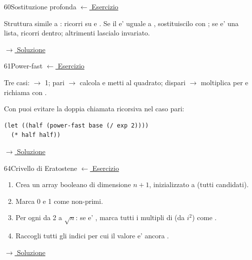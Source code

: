 \label{hint:60}
\begin{hintbox}{60}{Sostituzione profonda}
\small\color{black!55}\hyperref[ex:60]{$\leftarrow$ Esercizio}\normalsize\color{black}

Struttura simile a : ricorri su  e .
Se il  e' uguale a , sostituiscilo con ;
se e' una lista, ricorri dentro; altrimenti lascialo invariato.

\small\color{black!55}\hyperref[sol:60]{$\rightarrow$ Soluzione}\normalsize\color{black}
\end{hintbox}

\label{hint:61}
\begin{hintbox}{61}{Power-fast}
\small\color{black!55}\hyperref[ex:61]{$\leftarrow$ Esercizio}\normalsize\color{black}

Tre casi:  $\to$ 1;  pari $\to$ calcola
 e metti al quadrato;
 dispari $\to$ moltiplica per  e richiama
con .

Con  puoi evitare la doppia chiamata ricorsiva
nel caso pari:
\begin{lstlisting}
(let ((half (power-fast base (/ exp 2))))
  (* half half))
\end{lstlisting}

\small\color{black!55}\hyperref[sol:61]{$\rightarrow$ Soluzione}\normalsize\color{black}
\end{hintbox}

\label{hint:64}
\begin{hintbox}{64}{Crivello di Eratostene}
\small\color{black!55}\hyperref[ex:64]{$\leftarrow$ Esercizio}\normalsize\color{black}

\begin{enumerate}[leftmargin=2em]
  \item Crea un array booleano  di dimensione $n+1$,
        inizializzato a  (tutti candidati).
  \item Marca 0 e 1 come non-primi.
  \item Per ogni  da 2 a $\sqrt{n}$: se 
        e' , marca tutti i multipli di  (da $i^2$)
        come .
  \item Raccogli tutti gli indici per cui il valore e' ancora .
\end{enumerate}

\small\color{black!55}\hyperref[sol:64]{$\rightarrow$ Soluzione}\normalsize\color{black}
\end{hintbox}

